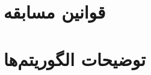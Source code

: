 \documentclass[a4paper,12pt]{report}
\begin{document}
	\section{}\label{sec3:chap1}
	\subsection{}\label{subsec1:sec3:chap1}

	\chapter{
		قوانین مسابقه
	}\label{chap2}




	\chapter{
		توضیحات الگوریتم‌ها
	}\label{chap3}



\end{document}
